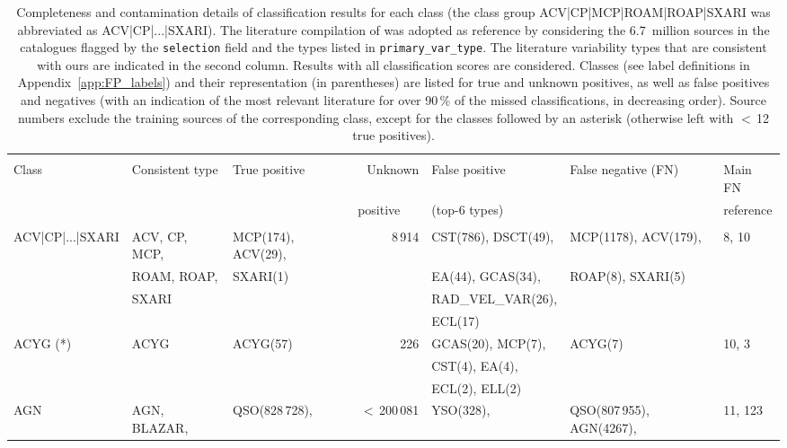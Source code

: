 \documentclass[longauth]{aa}
\begin{document}
\begin{landscape}
\begin{table} 
\caption[Completeness and contamination details]{Completeness and contamination details of classification results for each class (the class group ACV|CP|MCP|ROAM|ROAP|SXARI was abbreviated as ACV|CP|...|SXARI). The literature compilation of \citet{DR3-DPACP-177} was adopted as reference by considering the 6.7~million sources in the catalogues flagged by the \texttt{selection} field and the types listed in \texttt{primary\_var\_type}. The literature variability types that are consistent with ours are indicated in the second column. Results with all classification scores are considered. Classes (see label definitions in Appendix~\ref{app:FP_labels}) and their representation (in parentheses) are listed for true and unknown positives, as well as false positives and negatives (with an indication of the most relevant literature for over 90\,\% of the missed classifications, in decreasing order). Source numbers exclude the training sources of the corresponding class, except for the classes followed by an asterisk (otherwise left  with $<$\,12 true positives). \label{tab:results_details}} 
\centering                  
\begin{tabular}{@{}lllrlll@{}}     
\hline\hline & \\[-2.0ex]                 
Class & Consistent type & True positive & Unknown  & False positive & False negative (FN) & Main FN \\
      &  & &  positive~~~ & (top-6 types)  &  & reference \\
\hline & \\[-1.5ex]
ACV|CP|...|SXARI & ACV, CP, MCP, & MCP(174), ACV(29),& 8\,914 & CST(786), DSCT(49), & MCP(1178), ACV(179), & 8, 10  \\
                 & ROAM, ROAP,  & SXARI(1) &  & EA(44), GCAS(34), & ROAP(8), SXARI(5) &   \\
                 & SXARI        &          &  & RAD\_VEL\_VAR(26),  &  &   \\
                 &              &          &  & ECL(17) &  &   \\
ACYG (*) & ACYG & ACYG(57) & 226 & GCAS(20),  MCP(7), & ACYG(7) & 10, 3  \\
         &      &          &     & CST(4), EA(4), &  &   \\
         &      &          &     & ECL(2),  ELL(2) &   &   \\
AGN & AGN, BLAZAR, & QSO(828\,728),  & $<$\,200\,081 & YSO(328),   & QSO(807\,955), AGN(4267), & 11, 123  \\

\end{tabular}
\end{table}
\end{landscape}
\end{document}
